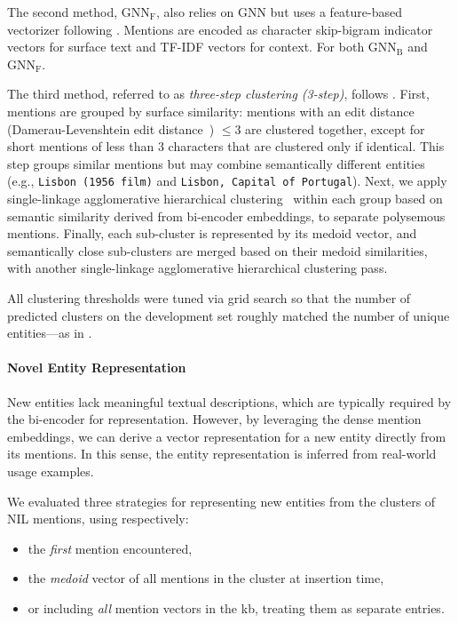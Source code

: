 The second method, \textit{$\text{GNN}_\text{F}$}, also relies on GNN but uses a feature-based vectorizer following \textcite{shrimpton-etal-2015-sampling}. Mentions are encoded as character skip-bigram indicator vectors for surface text and TF-IDF vectors for context. For both $\text{GNN}_\text{B}$ and $\text{GNN}_\text{F}$.

The third method, referred to as \emph{three-step clustering (3-step)}, follows \textcite{simone_24}. First, mentions are grouped by surface similarity: mentions with an edit distance (Damerau-Levenshtein edit distance~\cite{damerau1964}) $\le 3$ are clustered together, except for short mentions of less than 3 characters that are clustered only if identical. This step groups similar mentions but may combine semantically different entities (e.g., \texttt{Lisbon (1956 film)} and \texttt{Lisbon, Capital of Portugal}). Next, we apply single-linkage agglomerative hierarchical clustering~\cite{Rokach2005} within each group based on semantic similarity derived from bi-encoder embeddings, to separate polysemous mentions. Finally, each sub-cluster is represented by its medoid vector, and semantically close sub-clusters are merged based on their medoid similarities, with another single-linkage agglomerative hierarchical clustering pass.

All clustering thresholds were tuned via grid search so that the number of predicted clusters on the development set roughly matched the number of unique entities---as in \textcite{streaming_crossdoc_coreference}.

\paragraph{Novel Entity Representation} New entities lack meaningful textual descriptions, which are typically required by the bi-encoder for representation. However, by leveraging the dense mention embeddings, we can derive a vector representation for a new entity directly from its mentions. In this sense, the entity representation is inferred from real-world usage examples.

We evaluated three strategies for representing new entities from the clusters of NIL mentions, using respectively:
\begin{itemize}
    \item the \textit{first} mention encountered,
    \item the \textit{medoid} vector of all mentions in the cluster at insertion time,
    \item or including \textit{all} mention vectors in the \ac{kb}, treating them as separate entries.
\end{itemize}

